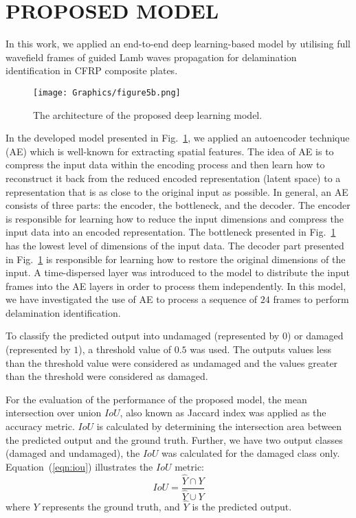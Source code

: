 \documentclass{IOS-Book-Article}
\begin{document}
\begin{sloppypar}
	\section{PROPOSED MODEL}\label{sec:section4}
	In this work, we applied an end-to-end deep learning-based model by utilising 
	full wavefield frames of guided Lamb waves propagation for delamination 
	identification in CFRP composite plates.
	\begin{figure} [h!]
		\begin{center}
			\texttt{[image: Graphics/figure5b.png]}
		\end{center}
		\caption{The architecture of the proposed deep learning model.} 
		\label{fig:AE_convlstm}
	\end{figure}
	
	In the developed model presented in Fig.~\ref{fig:AE_convlstm}, we applied an autoencoder technique (AE) which is well-known for extracting spatial features. 
	The idea of AE is to compress the input data within the encoding process and then learn how to reconstruct it back from the reduced encoded representation (latent space) to a representation that is as close to the original input as possible. 
	In general, an AE consists of three parts: the encoder, the bottleneck, and the decoder.
	The encoder is responsible for learning how to reduce the input dimensions and compress the input data into an encoded representation.
	The bottleneck presented in Fig.~\ref{fig:AE_convlstm} has the lowest level of dimensions of the input data.
	The decoder part presented in Fig.~\ref{fig:AE_convlstm} is responsible for learning how to restore the original dimensions of the input.
	A time-dispersed layer was introduced to the model to distribute the input frames into the AE layers in order to process them independently.
	In this model, we have investigated the use of AE to process a sequence of \(24\) frames to perform delamination identification.
	
	To classify the predicted output into undamaged (represented by \(0\)) or 
	damaged (represented by \(1\)), a threshold value of \(0.5\) was used. 
	The outputs values less than the threshold value were considered as undamaged 
	and the values greater than the threshold were considered as damaged.
	
	For the evaluation of the performance of the proposed model, the mean 
	intersection over union \(IoU\), also known as Jaccard index was applied as the 
	accuracy metric. 
	\(IoU\) is calculated by determining the intersection area between the 
	predicted output and the ground truth. 
	Further, we have two output classes (damaged and undamaged), the \(IoU\) was 
	calculated for the damaged class only. 
	Equation~(\ref{eqn:iou}) illustrates the \(IoU\) metric: 
	\begin{equation}
		IoU=\frac{\hat{Y} \cap Y}{\hat{Y} \cup Y}
		\label{eqn:iou}
	\end{equation}
	where \(Y\) represents the ground truth, and \(\hat{Y}\) is the predicted 
	output.
\end{sloppypar}
\end{document}
